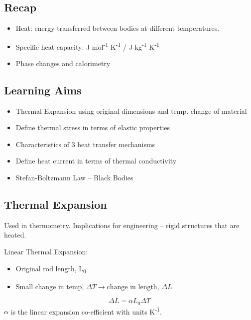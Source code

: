 \documentclass[a4paper, 11pt, normalem]{report}
\begin{document}
\chapter{}
\section{Recap}
\begin{itemize}
    \item Heat: energy transferred between bodies at different temperatures.
    \item Specific heat capacity: J mol\textsuperscript{-1} K\textsuperscript{-1} / J kg\textsuperscript{-1} K\textsuperscript{-1}
    \item Phase changes and calorimetry
\end{itemize}

\section{Learning Aims}
\begin{itemize}
    \item Thermal Expansion using original dimensions and temp. change of material
    \item Define thermal stress in terms of elastic properties
    \item Characteristics of 3 heat transfer mechanisms
    \item Define heat current in terms of thermal conductivity
    \item Stefan-Boltzmann Law -- Black Bodies
\end{itemize}

\section{Thermal Expansion}
Used in thermometry.
Implications for engineering -- rigid structures that are heated.

Linear Thermal Expansion:
\begin{itemize}
    \item Original rod length, L\textsubscript{0}
    \item Small change in temp, ${\Delta}T \rightarrow \text{change in length, } {\Delta}L$
\end{itemize}
\begin{equation}
    {\Delta}L = {\alpha}L_{0}{\Delta}T
\end{equation}
$\alpha$ is the linear expansion co-efficient with units K\textsuperscript{-1}.
\end{document}

